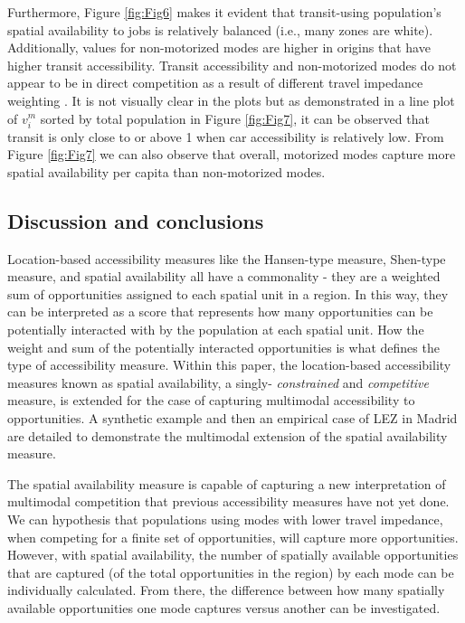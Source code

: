 \documentclass[numbered]{trbunofficial}
\begin{document}
Furthermore, Figure \ref{fig:Fig6} makes it evident that transit-using
population's spatial availability to jobs is relatively balanced (i.e.,
many zones are white). Additionally, values for non-motorized modes are
higher in origins that have higher transit accessibility. Transit
accessibility and non-motorized modes do not appear to be in direct
competition as a result of different travel impedance weighting . It is
not visually clear in the plots but as demonstrated in a line plot of
\(v_i^m\) sorted by total population in Figure \ref{fig:Fig7}, it can be
observed that transit is only close to or above 1 when car accessibility
is relatively low. From Figure \ref{fig:Fig7} we can also observe that
overall, motorized modes capture more spatial availability per capita
than non-motorized modes.

\hypertarget{discussion-and-conclusions}{%
\subsection{Discussion and
conclusions}\label{discussion-and-conclusions}}

Location-based accessibility measures like the Hansen-type measure,
Shen-type measure, and spatial availability all have a commonality -
they are a weighted sum of opportunities assigned to each spatial unit
in a region. In this way, they can be interpreted as a score that
represents how many opportunities can be potentially interacted with by
the population at each spatial unit. How the weight and sum of the
potentially interacted opportunities is what defines the type of
accessibility measure. Within this paper, the location-based
accessibility measures known as spatial availability, a singly-
\emph{constrained} and \emph{competitive} measure, is extended for the
case of capturing multimodal accessibility to opportunities. A synthetic
example and then an empirical case of LEZ in Madrid are detailed to
demonstrate the multimodal extension of the spatial availability
measure.

The spatial availability measure is capable of capturing a new
interpretation of multimodal competition that previous accessibility
measures have not yet done. We can hypothesis that populations using
modes with lower travel impedance, when competing for a finite set of
opportunities, will capture more opportunities. However, with spatial
availability, the number of spatially available opportunities that are
captured (of the total opportunities in the region) by each mode can be
individually calculated. From there, the difference between how many
spatially available opportunities one mode captures versus another can
be investigated.
\end{document}
